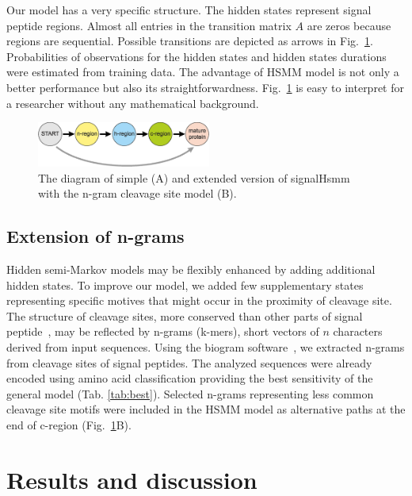 \documentclass[10pt,letterpaper]{article}
\begin{document}
Our model has a very specific structure. The hidden states represent signal peptide regions.
Almost all entries in the transition matrix $A$ are zeros because regions are sequential.
Possible transitions are depicted as arrows in Fig.~\ref{fig:ngramext}.
Probabilities of observations for the hidden states and hidden states durations were estimated from training data.
The advantage of HSMM model is not only a better performance but also its straightforwardness.
Fig.~\ref{fig:ngramext} is easy to interpret for a researcher without any mathematical background.


\begin{figure}[ht]\centering
\includegraphics[width=0.51\textwidth]{figures/HSMMs.eps}
\caption{The diagram of simple (A) and extended version of signalHsmm with the n-gram cleavage site model (B).}
\label{fig:ngramext}
\end{figure}

    
\subsection*{Extension of n-grams}

Hidden semi-Markov models may be flexibly enhanced by adding additional hidden states. To improve our model, we added few supplementary states representing specific motives that might occur in the proximity of cleavage site. The structure of cleavage sites, more conserved than other parts of signal peptide~\cite{2004hillerpredisi}, may be reflected by n-grams (k-mers), short vectors of $n$ characters derived from input sequences. Using the biogram software~\cite{biogramPackage}, we extracted n-grams from cleavage sites of signal peptides. The analyzed sequences were already encoded using amino acid classification providing the best sensitivity of the general model (Tab. \ref{tab:best}). Selected n-grams representing less common cleavage site motifs were included in the HSMM model as alternative paths at the end of c-region (Fig.~\ref{fig:ngramext}B).


\section*{Results and discussion}
\end{document}
